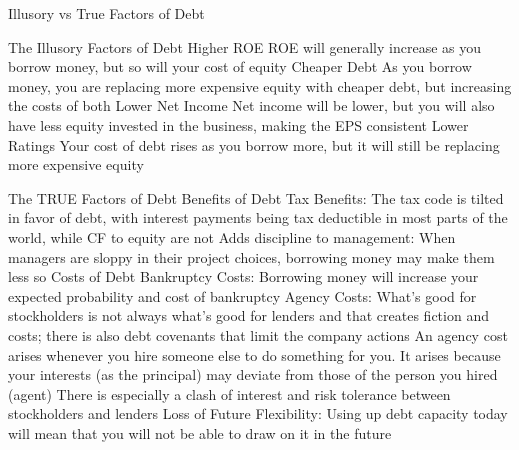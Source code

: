 \documentclass[10pt]{article}
\begin{document}
    \begin{core}{Illusory vs True Factors of Debt}

      The Illusory Factors of Debt
      Higher ROE
      ROE will generally increase as you borrow money, but so will your cost of equity
      Cheaper Debt
      As you borrow money, you are replacing more expensive equity with cheaper debt, but increasing the costs of both
      Lower Net Income
      Net income will be lower, but you will also have less equity invested in the business, making the EPS consistent
      Lower Ratings
      Your cost of debt rises as you borrow more, but it will still be replacing more expensive equity

      The TRUE Factors of Debt
      Benefits of Debt
      Tax Benefits: The tax code is tilted in favor of debt, with interest payments being tax deductible in most parts of the world, while CF to equity are not
      Adds discipline to management: When managers are sloppy in their project choices, borrowing money may make them less so
      Costs of Debt
      Bankruptcy Costs: Borrowing money will increase your expected probability and cost of bankruptcy
      Agency Costs: What’s good for stockholders is not always what’s good for lenders and that creates fiction and costs; there is also debt covenants that limit the company actions
      An agency cost arises whenever you hire someone else to do something for you. It arises because your interests (as the principal) may deviate from those of the person you hired (agent)
      There is especially a clash of interest and risk tolerance between stockholders and lenders
      Loss of Future Flexibility: Using up debt capacity today will mean that you will not be able to draw on it in the future

    \end{core}
\end{document}
